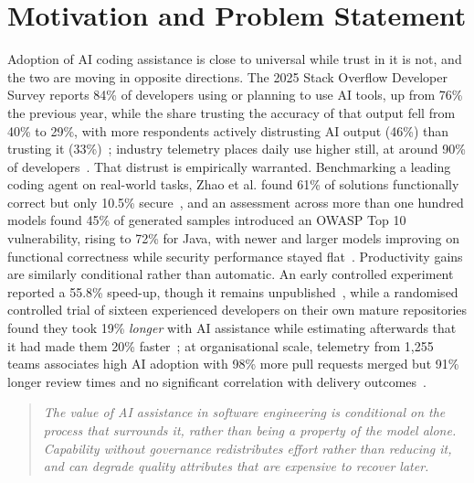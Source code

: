 \documentclass[sigconf,review=false]{acmart}
\begin{document}

\maketitle

\section{Motivation and Problem Statement}
\label{sec:motivation}

Adoption of AI coding assistance is close to universal while trust in it is not, and the two are moving in opposite directions. The 2025 Stack Overflow Developer Survey reports 84\% of developers using or planning to use AI tools, up from 76\% the previous year, while the share trusting the accuracy of that output fell from 40\% to 29\%, with more respondents actively distrusting AI output (46\%) than trusting it (33\%)~\cite{StackOverflow:2025dev}; industry telemetry places daily use higher still, at around 90\% of developers~\cite{DORA:2025ai}. That distrust is empirically warranted. Benchmarking a leading coding agent on real-world tasks, Zhao et al. found 61\% of solutions functionally correct but only 10.5\% secure~\cite{Zhao:2025vibe}, and an assessment across more than one hundred models found 45\% of generated samples introduced an OWASP Top 10 vulnerability, rising to 72\% for Java, with newer and larger models improving on functional correctness while security performance stayed flat~\cite{Veracode:2025gen}. Productivity gains are similarly conditional rather than automatic. An early controlled experiment reported a 55.8\% speed-up, though it remains unpublished~\cite{Peng:2023cop}, while a randomised controlled trial of sixteen experienced developers on their own mature repositories found they took 19\% \emph{longer} with AI assistance while estimating afterwards that it had made them 20\% faster~\cite{Becker:2025rct}; at organisational scale, telemetry from 1,255 teams associates high AI adoption with 98\% more pull requests merged but 91\% longer review times and no significant correlation with delivery outcomes~\cite{Faros:2025par}.

\begin{quote}
\emph{The value of AI assistance in software engineering is conditional on the process that surrounds it, rather than being a property of the model alone. Capability without governance redistributes effort rather than reducing it, and can degrade quality attributes that are expensive to recover later.}
\end{quote}
\end{document}
